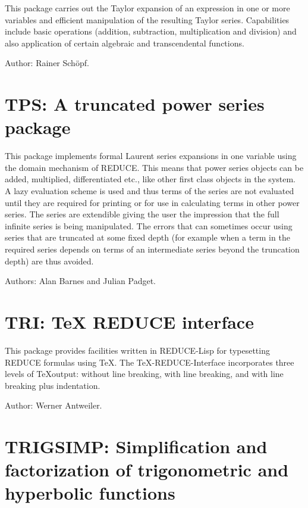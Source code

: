 This package carries out the Taylor expansion of an expression in one or
more variables and efficient manipulation of the resulting Taylor series.
Capabilities include basic operations (addition, subtraction,
multiplication and division) and also application of certain algebraic and
transcendental functions.

Author: Rainer Sch\"opf.


\newpage

\section{TPS: A truncated power series package}  

This package implements formal Laurent series expansions in one variable
using the domain mechanism of REDUCE.  This means that power series
objects can be added, multiplied, differentiated etc.,  like other first
class objects in the system.  A lazy evaluation scheme is used and thus
terms of the series are not evaluated until they are required for printing
or for use in calculating terms in other power series.  The series are
extendible giving the user the impression that the full infinite series is
being manipulated.  The errors that can sometimes occur using series that
are truncated at some fixed depth (for example when a term in the required
series depends on terms of an intermediate series beyond the truncation
depth) are thus avoided.

Authors:  Alan Barnes and Julian Padget.


\newpage

\section{TRI: TeX REDUCE interface} 

This package provides facilities written in REDUCE-Lisp for typesetting
REDUCE formulas using \TeX.  The \TeX-REDUCE-Interface incorporates three
levels of \TeX output: without line breaking, with line breaking, and
with line breaking plus indentation.

Author: Werner Antweiler.

\newpage

\section{TRIGSIMP: Simplification and factorization of trigonometric
and hyperbolic functions} 
\label{TRIGSIMP}

